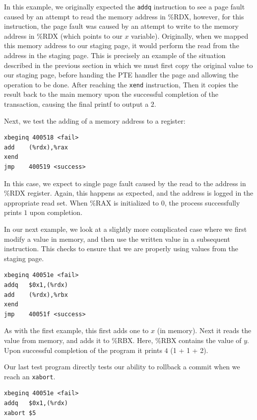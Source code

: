 \documentclass{acm_proc_article-sp}
\begin{document}
In this example, we originally expected the \texttt{addq} instruction to see a page
fault caused by an attempt to read the memory address in \%RDX, however, for
this instruction, the page fault was caused by an attempt to write to the
memory address in \%RDX (which points to our $x$ variable). Originally, when we
mapped this memory address to our staging page, it would perform the read from
the address in the staging page.  This is precisely an example of the situation 
described in the previous section in which we must first copy the original value
to our staging page, before handing the PTE handler the page and allowing the
operation to be done.
After reaching the \texttt{xend} instruction,  Then it
copies the result back to the main memory upon the successful completion of the
transaction, causing the final printf to output a $2$.

Next, we test the adding of a memory address to a register:

\begin{verbatim}
xbeginq 400518 <fail>
add    (%rdx),%rax
xend   
jmp    400519 <success>
\end{verbatim}

In this case, we expect to single page fault caused by the read to the address
in \%RDX register. Again, this happens as expected, and the address is logged
in the appropriate read set. When \%RAX is initialized to 0, the process 
successfully prints $1$ upon completion.


In our next example, we look at a slightly more complicated case where we first
modify a value in memory, and then use the written value in a subsequent
instruction. This checks to ensure that we are properly using values from the
staging page. 

\begin{verbatim}
xbeginq 40051e <fail>
addq   $0x1,(%rdx)
add    (%rdx),%rbx
xend   
jmp    40051f <success>
\end{verbatim}

As with the first example, this first adds one to $x$ (in memory). Next it
reads the value from memory, and adds it to \%RBX. Here, \%RBX contains the
value of $y$.  Upon successful completion of the program it prints $4$ ({1 + 1
+ 2}).


Our last test program directly tests our ability to rollback a commit when we
reach an \texttt{xabort}.

\begin{verbatim}
xbeginq 40051e <fail>
addq   $0x1,(%rdx)
xabort $5
\end{verbatim}
\end{document}
